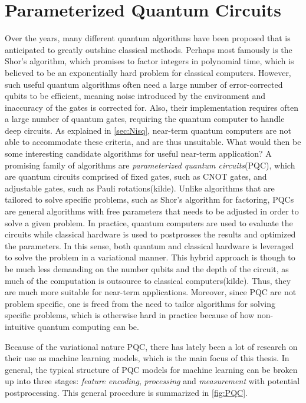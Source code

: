 \chapter{Parameterized Quantum Circuits}\label{chap:QML}
Over the years, many different quantum algorithms have been proposed that is anticipated to greatly outshine classical methods. Perhaps most famously is the Shor's algorithm, which promises to factor integers in polynomial time, which is believed to be an exponentially hard problem for classical computers. However, such useful quantum algorithms often need a large number of error-corrected qubits to be efficient, meaning noise introduced by the environment and inaccuracy of the gates is corrected for. Also, their implementation requires often a large number of quantum gates, requiring the quantum computer to handle deep circuits. As explained in \autoref{sec:Nisq}, near-term quantum computers are not able to accommodate these criteria, and are thus unsuitable. What would then be some interesting candidate algorithms for useful near-term application? A promising family of algorithms are \emph{parameterized quantum circuits}(PQC), which are quantum circuits comprised of fixed gates, such as CNOT gates, and adjustable gates, such as Pauli rotations(kilde). Unlike algorithms that are tailored to solve specific problems, such as Shor's algorithm for factoring, PQCs are general algorithms with free parameters that needs to be adjusted in order to solve a given problem. In practice, quantum computers are used to evaluate the circuits while classical hardware is used to postprosses the results and optimized the parameters. In this sense, both quantum and classical hardware is leveraged to solve the problem in a variational manner. This hybrid approach is though to be much less demanding on the number qubits and the depth of the circuit, as much of the computation is outsource to classical computers(kilde). Thus, they are much more suitable for near-term applications. Moreover, since PQC are not problem specific, one is freed from the need to tailor algorithms for solving specific problems, which is otherwise hard in practice because of how non-intuitive quantum computing can be. 

Because of the variational nature PQC, there has lately been a lot of research on their use as machine learning models, which is the main focus of this thesis. In general, the typical structure of PQC models for machine learning can be broken up into three stages: \emph{feature encoding}, \emph{processing} and \emph{measurement} with potential postprocessing. This general procedure is summarized in \autoref{fig:PQC}.


